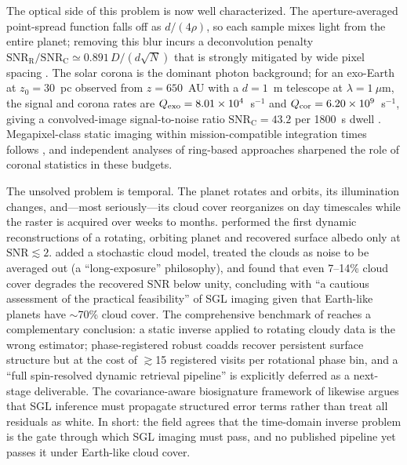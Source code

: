 \documentclass[twocolumn]{emulateapj}
\begin{document}
The optical side of this problem is now well characterized. The
aperture-averaged point-spread function falls off as $d/(4\rho)$, so each
sample mixes light from the entire planet; removing this blur incurs a
deconvolution penalty $\mathrm{SNR_R/SNR_C}\simeq0.891\,D/(d\sqrt{N})$
that is strongly mitigated by wide pixel spacing \citep{toth21,tt22mnras}.
The solar corona is the dominant photon background; for an exo-Earth at
$z_0=30$~pc observed from $z=650$~AU with a $d=1$~m telescope at
$\lambda=1~\mu$m, the signal and corona rates are
$Q_{\rm exo}=8.01\times10^4$~s$^{-1}$ and
$Q_{\rm cor}=6.20\times10^9$~s$^{-1}$, giving a convolved-image
signal-to-noise ratio $\mathrm{SNR_C}=43.2$ per 1800~s dwell
\citep{tt22mnras,tur26bench}. Megapixel-class static imaging within
mission-compatible integration times follows \citep{toth21,tt22mnras},
and independent analyses of ring-based approaches
\citep{mm22} sharpened the role of coronal statistics in these budgets.

The unsolved problem is temporal. The planet rotates and orbits, its
illumination changes, and---most seriously---its cloud cover reorganizes
on day timescales while the raster is acquired over weeks to months.
\citet{toth23} performed the first dynamic reconstructions of a rotating,
orbiting planet and recovered surface albedo only at
$\mathrm{SNR}\lesssim2$. \citet{toth25clouds} added a stochastic cloud
model, treated the clouds as noise to be averaged out (a
``long-exposure'' philosophy), and found that even 7--14\% cloud cover
degrades the recovered SNR below unity, concluding with ``a cautious
assessment of the practical feasibility'' of SGL imaging given that
Earth-like planets have $\sim$70\% cloud cover. The comprehensive
benchmark of \citet{tur26bench} reaches a complementary conclusion: a
static inverse applied to rotating cloudy data is the wrong estimator;
phase-registered robust coadds recover persistent surface structure but
at the cost of $\gtrsim$15 registered visits per rotational phase bin,
and a ``full spin-resolved dynamic retrieval pipeline'' is explicitly
deferred as a next-stage deliverable. The covariance-aware biosignature
framework of \citet{cov26} likewise argues that SGL inference must
propagate structured error terms rather than treat all residuals as
white. In short: the field agrees that the time-domain inverse problem is
the gate through which SGL imaging must pass, and no published pipeline
yet passes it under Earth-like cloud cover.
\end{document}
